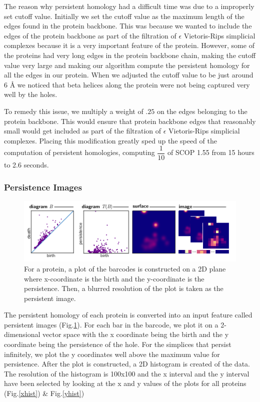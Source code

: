 \documentclass[12pt, a4paper, twocolumn, fullpage]{article}
\theoremstyle{plain}
\theoremstyle{definition}
\theoremstyle{remark}
\begin{document}
The reason why persistent homology had a difficult time was due to a improperly set cutoff value. Initially we set the cutoff value as the maximum length of the edges found in the protein backbone. This was because we wanted to include the edges of the protein backbone as part of the filtration of $\epsilon$ Vietoris-Rips simplicial complexes because it is a very important feature of the protein. However, some of the proteins had very long edges in the protein backbone chain, making the cutoff value very large and making our algorithm compute the persistent homology for all the edges in our protein. When we adjusted the cutoff value to be just around 6 Å we noticed that beta helices along the protein were not being captured very well by the holes.

To remedy this issue, we multiply a weight of $.25$ on the edges belonging to the protein backbone. This would ensure that protein backbone edges that reasonably small would get included as part of the filtration of $\epsilon$ Vietoris-Rips simplicial complexes. Placing this modification greatly sped up the speed of the computation of persistent homologies, computing $\dfrac{1}{10}$ of SCOP 1.55 from 15 hours to 2.6 seconds.

\subsubsection{ Persistence Images}

\begin{figure}
    \includegraphics[width=\linewidth]{persistenceimages.png}
    \caption{For a protein, a plot of the barcodes is constructed on a 2D plane where x-coordinate is the birth and the y-coordinate is the persistence. Then, a blurred resolution of the plot is taken as the persistent image.}
    \label{persistenceimages}
\end{figure}

The persistent homology of each protein is converted into an input feature called persistent images (Fig.\ref{persistenceimages}). For each bar in the barcode, we plot it on a 2-dimensional vector space with the x coordinate being the birth and the y coordinate being the persistence of the hole. For the simplices that persist infinitely, we plot the y coordinates well above the maximum value for persistence. After the plot is constructed, a 2D histogram is created of the data. The resolution of the histogram is 100x100 and the x interval and the y interval have been selected by looking at the x and y values of the plots for all proteins (Fig.\ref{xhist}) \& Fig.\ref{yhist})
\end{document}
